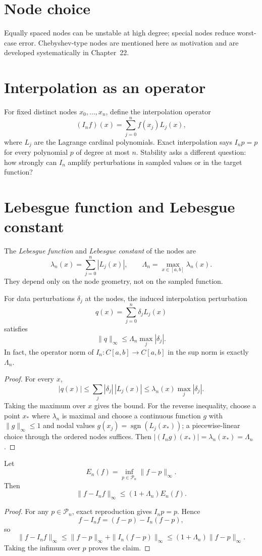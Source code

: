 \section{Node choice}
Equally spaced nodes can be unstable at high degree; special nodes reduce worst-case error. Chebyshev-type nodes are mentioned here as motivation and are developed systematically in Chapter~22.

\section{Interpolation as an operator}
For fixed distinct nodes $x_0,\ldots,x_n$, define the interpolation operator
\[
(I_nf)(x)=\sum_{j=0}^n f(x_j)L_j(x),
\]
where $L_j$ are the Lagrange cardinal polynomials. Exact interpolation says $I_np=p$ for every polynomial $p$ of degree at most $n$. Stability asks a different question: how strongly can $I_n$ amplify perturbations in sampled values or in the target function?

\section{Lebesgue function and Lebesgue constant}
The \emph{Lebesgue function} and \emph{Lebesgue constant} of the nodes are
\[
\lambda_n(x)=\sum_{j=0}^n|L_j(x)|,
\qquad
\Lambda_n=\max_{x\in[a,b]}\lambda_n(x).
\]
They depend only on the node geometry, not on the sampled function.

\begin{theorem}\label{thm:ii20-lebesgue-stability}
For data perturbations $\delta_j$ at the nodes, the induced interpolation perturbation
\[
q(x)=\sum_{j=0}^n\delta_jL_j(x)
\]
satisfies
\[
\|q\|_\infty\le \Lambda_n\max_j|\delta_j|.
\]
In fact, the operator norm of $I_n:C[a,b]\to C[a,b]$ in the sup norm is exactly $\Lambda_n$.
\begin{proof}
For every $x$,
\[
|q(x)|\le\sum_j|\delta_j|\,|L_j(x)|
\le\lambda_n(x)\max_j|\delta_j|.
\]
Taking the maximum over $x$ gives the bound. For the reverse inequality, choose a point $x_*$ where $\lambda_n$ is maximal and choose a continuous function $g$ with $\|g\|_\infty\le1$ and nodal values $g(x_j)=\operatorname{sgn}(L_j(x_*))$; a piecewise-linear choice through the ordered nodes suffices. Then $|(I_ng)(x_*)|=\lambda_n(x_*)=\Lambda_n$.
\end{proof}
\end{theorem}

\begin{theorem}\label{thm:ii20-lebesgue-quasioptimal}
Let
\[
E_n(f)=\inf_{p\in\mathcal P_n}\|f-p\|_\infty.
\]
Then
\[
\|f-I_nf\|_\infty\le(1+\Lambda_n)E_n(f).
\]
\begin{proof}
For any $p\in\mathcal P_n$, exact reproduction gives $I_np=p$. Hence
\[
f-I_nf=(f-p)-I_n(f-p),
\]
so
\[
\|f-I_nf\|_\infty
\le\|f-p\|_\infty+\|I_n(f-p)\|_\infty
\le(1+\Lambda_n)\|f-p\|_\infty.
\]
Taking the infimum over $p$ proves the claim.
\end{proof}
\end{theorem}

